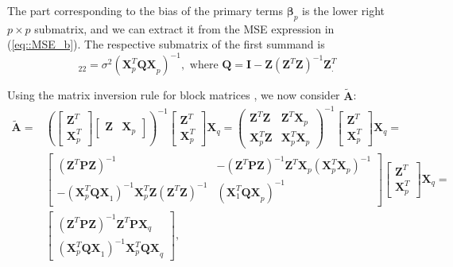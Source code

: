 The part  corresponding to the bias of the primary terms $\bm{\beta}_p$ is the lower right $p \times p$ submatrix, and we can extract it from the MSE expression in (\ref{eq::MSE_b}). The respective submatrix of the first summand  is
\begin{equation*}
[\sigma^2(\bm{\tilde{X}}_p^{T}\bm{\tilde{X}}_p)^{-1}]_{22}=\sigma^2(\bm{X}^T_{p}
\bm{QX}_{p})^{-1}, \mbox { where } \bm{Q}=\bm{I}-\bm{Z}(\bm{Z}^T\bm{Z})^{-1}\bm{Z}^T_{.} 
\end{equation*}

Using the matrix inversion rule for block matrices \citep{Harville2006matrix}, we now consider $\bm{\tilde{A}}$:
\begin{align*}
\bm{\tilde{A}}=&\left(
\begin{bmatrix}
\bm{Z}^T\\
\bm{X}^T_{p}
\end{bmatrix}
\begin{bmatrix}
\bm{Z} & \bm{X}_{p}
\end{bmatrix}\right)^{-1}
\begin{bmatrix}
\bm{Z}^T\\
\bm{X}^T_{p}
\end{bmatrix}\bm{X}_{q}=
\begin{pmatrix}
\bm{Z}^T\bm{Z} & \bm{Z}^T\bm{X}_{p}\\
\bm{X}^T_{p}\bm{Z} & \bm{X}^T_{p}\bm{X}_{p}
\end{pmatrix}^{-1}
\begin{bmatrix}
\bm{Z}^T\\
\bm{X}^T_{p}
\end{bmatrix}\bm{X}_{q}=
\\ &
\begin{bmatrix}
(\bm{Z}^T\bm{PZ})^{-1} & -(\bm{Z}^T\bm{PZ})^{-1}\bm{Z}^T\bm{X}_{p}(\bm{X}^T_{p}\bm{X}_{p})^{-1} \\
-(\bm{X}^T_{p}\bm{QX}_{1})^{-1}\bm{X}^T_{p}\bm{Z}(\bm{Z}^T\bm{Z})^{-1} & (\bm{X}^T_{1}\bm{QX}_{p})^{-1}
\end{bmatrix}
\begin{bmatrix}
\bm{Z}^T\\
\bm{X}^T_{p}
\end{bmatrix}\bm{X}_{q}=\\ &
\begin{bmatrix}
(\bm{Z}^T\bm{PZ})^{-1}\bm{Z}^T\bm{PX}_{q}\\
(\bm{X}^T_{p}\bm{QX}_{1})^{-1}\bm{X}^T_{p}\bm{QX}_{q}
\end{bmatrix}, 
\end{align*}
